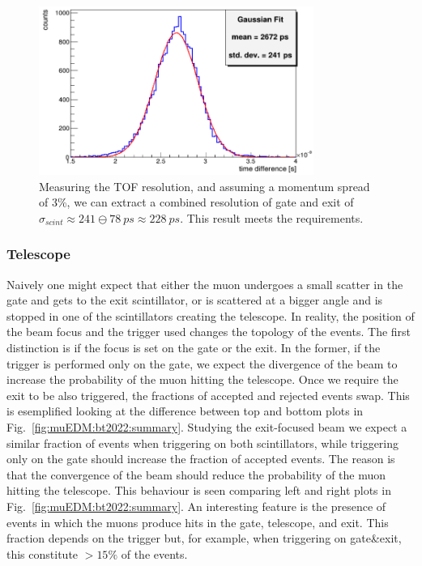 \begin{refsection}
            \begin{figure}
                \centering
                \includegraphics[width = 0.8\textwidth]{Figures/muEDM_Nov2022/gate_resolution.png}
                \caption[muEDM:2022 time resolution]{Measuring the TOF resolution, and assuming a momentum spread of 3\%, we can extract a combined resolution of gate and exit of $\sigma_{scint}\approx 241 \ominus \SI{78}{ps} \approx \SI{228}{ps}$. This result meets the requirements.}
                \label{fig:muEDM:bt20212gate:resolution}
            \end{figure}

        \subsubsection{Telescope}
            \noindent
            Naively one might expect that either the muon undergoes a small scatter in the gate and gets to the exit scintillator, or is scattered at a bigger angle and is stopped in one of the scintillators creating the telescope.
            In reality, the position of the beam focus and the trigger used changes the topology of the events.
            The first distinction is if the focus is set on the gate or the exit.
            In the former, if the trigger is performed only on the gate, we expect the divergence of the beam to increase the probability of the muon hitting the telescope.
            Once we require the exit to be also triggered, the fractions of accepted and rejected events swap. 
            This is esemplified looking at the difference between top and bottom plots in Fig.~\ref{fig:muEDM:bt2022:summary}.
            Studying the exit-focused beam we expect a similar fraction of events when triggering on both scintillators, while triggering only on the gate should increase the fraction of accepted events.
            The reason is that the convergence of the beam should reduce the probability of the muon hitting the telescope.
            This behaviour is seen comparing left and right plots in Fig.~\ref{fig:muEDM:bt2022:summary}.
            An interesting feature is the presence of events in which the muons produce hits in the gate, telescope, and exit. 
            This fraction depends on the trigger but, for example, when triggering on gate\&exit, this constitute $>15\%$ of the events.\\


\end{refsection}
